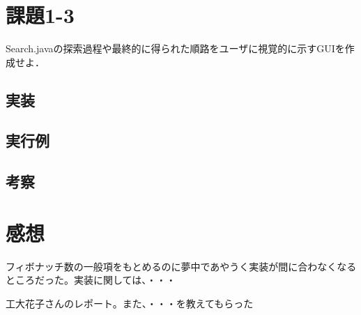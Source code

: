 \documentclass{jarticle}
\begin{document}
\section{課題1-3}
\begin{screen}
  Search.javaの探索過程や最終的に得られた順路をユーザに視覚的に示すGUIを作成せよ．
\end{screen}

\subsection{実装}

\subsection{実行例}

\subsection{考察}

\section{感想}
フィボナッチ数の一般項をもとめるのに夢中であやうく実装が間に合わなくなるところだった。実装に関しては、・・・


\begin{thebibliography}{99}

 工大花子さんのレポート。また、・・・を教えてもらった 

\end{thebibliography}
\end{document}
